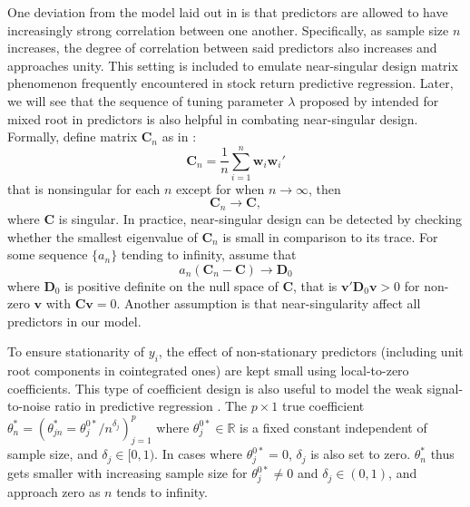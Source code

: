 \documentclass[12pt,a4paper]{article}
\begin{document}
One deviation from the model laid out in \cite{lee2018lasso} is that predictors are allowed to have increasingly strong correlation between one another. Specifically, as sample size $ n $ increases, the degree of correlation between said predictors also increases and approaches unity. This setting is included to emulate near-singular design matrix phenomenon frequently encountered in stock return predictive regression. Later, we will see that the sequence of tuning parameter $ \lambda $ proposed by \cite{lee2018lasso} intended for mixed root in predictors is also helpful in combating near-singular design. Formally, define matrix $ \bm{C}_n $ as in \cite{knight2008shrinkage}:
\begin{equation}\label{eq:2}
	\bm{C}_n = \frac{1}{n}\sum_{i = 1}^{n}\bm{w}_i \bm{w}_i'
\end{equation}
that is nonsingular for each $ n $ except for when $ n \rightarrow \infty $, then 
\begin{equation}\label{eq:3}
	\bm{C}_n \rightarrow \bm{C},
\end{equation}
where $ \bm{C} $ is singular. In practice, near-singular design can be detected by checking whether the smallest eigenvalue of $ \bm{C}_n $ is small in comparison to its trace. 
For some sequence $ \{a_n\}$ tending to infinity, assume that
\begin{equation}\label{eq:4}
	a_n(\bm{C}_n - \bm{C}) \rightarrow \bm{D}_0
\end{equation}
where $ \bm{D}_0 $ is positive definite on the null space of $ \bm{C} $, that is $ \bm{v}'\bm{D}_0\bm{v} > 0 $ for non-zero $ \bm{v} $ with $ \bm{C}\bm{v} = 0 $.
Another assumption is that near-singularity affect all predictors in our model.

To ensure stationarity of $ y_i $, the effect of non-stationary predictors (including unit root components in cointegrated ones) are kept small using local-to-zero coefficients. This type of coefficient design is also useful to model the weak signal-to-noise ratio in predictive regression \citep{phillips2013predictive, lee2018lasso}. The $ p \times 1$ true coefficient $ \theta^*_n = (\theta^*_{jn} = \theta^{0*}_j/n^{\delta_j})^p_{j = 1} $ where $ \theta^{0*}_j \in \mathbb{R} $ is a fixed constant independent of sample size, and $ \delta_j \in [0, 1) $. In cases where $ \theta^{0*}_j = 0 $,  $ \delta_j $ is also set to zero. $ \theta^*_n $ thus gets smaller with increasing sample size for $ \theta^{0*}_j \neq 0 $ and $ \delta_j \in (0, 1) $, and approach zero as $ n $ tends to infinity.
\end{document}
